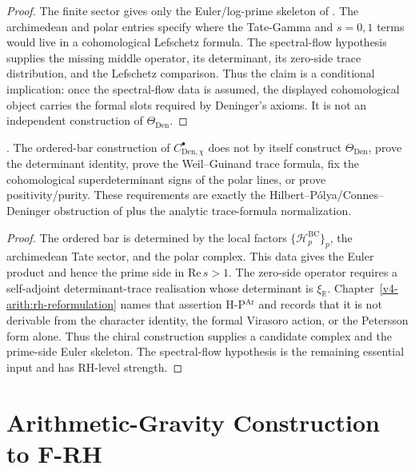 \begin{proof}
The finite sector gives only the Euler/log-prime skeleton of
. The archimedean and
polar entries specify where the Tate-Gamma and \(s=0,1\) terms would
live in a cohomological Lefschetz formula. The spectral-flow
hypothesis supplies the missing middle operator, its determinant, its
zero-side trace distribution, and the Lefschetz comparison. Thus the
claim is a conditional implication: once the spectral-flow data is assumed,
the displayed cohomological object carries the formal slots required by
Deninger's axioms. It is not an independent construction of
\(\Theta_{\mathrm{Den}}\).
\end{proof}

\begin{proposition}
\label{v4-arith:3d-acs:prop:deninger-gap}
\ClaimStatusProvedHere. The ordered-bar construction of
\(C_{\mathrm{Den},\chi}^{\bullet}\) does not by itself construct
\(\Theta_{\mathrm{Den}}\), prove the determinant identity, prove the
Weil--Guinand trace formula, fix the cohomological superdeterminant
signs of the polar lines, or prove positivity/purity. These
requirements are exactly the Hilbert--P\'olya/Connes--Deninger
obstruction of  plus the analytic
trace-formula normalization.
\end{proposition}

\begin{proof}
The ordered bar is determined by the local factors
\(\{\mathcal H_{p}^{\mathrm{BC}}\}_{p}\), the archimedean Tate sector,
and the polar complex. This data gives the Euler product and hence the
prime side in \(\mathrm{Re}\,s>1\). The zero-side operator requires a
self-adjoint determinant-trace realisation whose determinant is
\(\xi_{\mathbb R}\). Chapter~\ref{v4-arith:rh-reformulation} names
that assertion H-P\(^{\mathrm{Ar}}\) and records that it is not
derivable from the character identity, the formal Virasoro action, or
the Petersson form alone. Thus the chiral construction supplies a
candidate complex and the prime-side Euler skeleton. The spectral-flow
hypothesis is the remaining essential input and has RH-level
strength.
\end{proof}

\section{Arithmetic-Gravity Construction to F-RH}
\label{v4-arith:3d-acs:arith-gravity}


